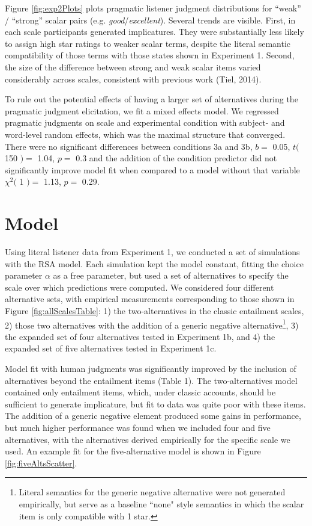 \documentclass[10pt, letterpaper]{article}
\begin{document}
Figure \ref{fig:exp2Plots} plots pragmatic listener judgment
distributions for ``weak'' / ``strong'' scalar pairs (e.g.
\emph{good}/\emph{excellent}). Several trends are visible. First, in
each scale participants generated implicatures. They were substantially
less likely to assign high star ratings to weaker scalar terms, despite
the literal semantic compatibility of those terms with those states
shown in Experiment 1. Second, the size of the difference between strong
and weak scalar items varied considerably across scales, consistent with
previous work (Tiel, 2014).

To rule out the potential effects of having a larger set of alternatives
during the pragmatic judgment elicitation, we fit a mixed effects model.
We regressed pragmatic judgments on scale and experimental condition
with subject- and word-level random effects, which was the maximal
structure that converged. There were no significant differences between
conditions 3a and 3b, \(b =\) 0.05, \(t(\) 150 \() =\) 1.04, \(p =\) 0.3
and the addition of the condition predictor did not significantly
improve model fit when compared to a model without that variable
\(\chi^2(\) 1 \() =\) 1.13, \(p =\) 0.29.

\section{Model}\label{model}

Using literal listener data from Experiment 1, we conducted a set of
simulations with the RSA model. Each simulation kept the model constant,
fitting the choice parameter \(\alpha\) as a free parameter, but used a
set of alternatives to specify the scale over which predictions were
computed. We considered four different alternative sets, with empirical
measurements corresponding to those shown in Figure
\ref{fig:allScalesTable}: 1) the two-alternatives in the classic
entailment scales, 2) those two alternatives with the addition of a
generic negative
alternative\footnote{Literal semantics for the generic negative alternative were not generated empirically, but serve as a baseline ``none" style semantics in which the scalar item is only compatible with 1 star.},
3) the expanded set of four alternatives tested in Experiment 1b, and 4)
the expanded set of five alternatives tested in Experiment 1c.

Model fit with human judgments was significantly improved by the
inclusion of alternatives beyond the entailment items (Table 1). The
two-alternatives model contained only entailment items, which, under
classic accounts, should be sufficient to generate implicature, but fit
to data was quite poor with these items. The addition of a generic
negative element produced some gains in performance, but much higher
performance was found when we included four and five alternatives, with
the alternatives derived empirically for the specific scale we used. An
example fit for the five-alternative model is shown in Figure
\ref{fig:fiveAltsScatter}.
\end{document}
